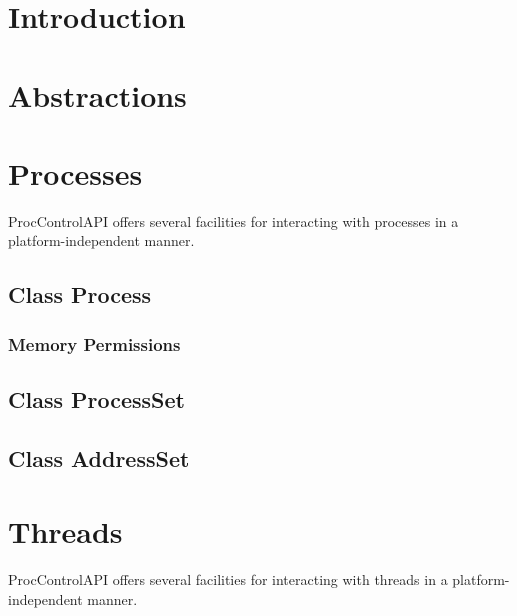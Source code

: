 \documentclass{article}
\begin{document}



\tableofcontents
\clearpage

\setcounter{secnumdepth}{5}

\section{Introduction}
  

\section{Abstractions}
  

\section{Processes}
  ProcControlAPI offers several facilities for interacting with processes in a
  platform-independent manner.

  \subsection{Class Process}
  \label{subsec:process}
    

    \subsubsection{Memory Permissions}
      

  \subsection{Class ProcessSet}
    

  \subsection{Class AddressSet}
    

\section{Threads}
  ProcControlAPI offers several facilities for interacting with threads in a
  platform-independent manner.
\end{document}
